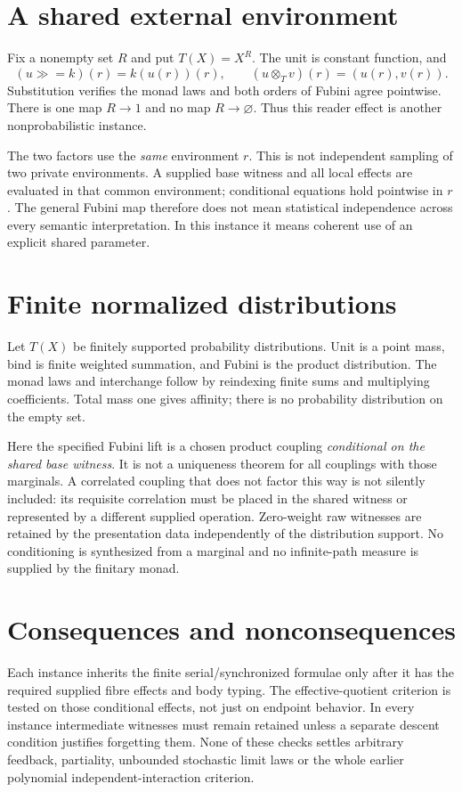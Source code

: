 \documentclass{article}
\begin{document}
\section{A shared external environment}
Fix a nonempty set $R$ and put $T(X)=X^R$. The unit is constant function, and
\[
 (u\mathbin{\gg=}k)(r)=k(u(r))(r),\qquad
 (u\otimes_Tv)(r)=(u(r),v(r)).
\]
Substitution verifies the monad laws and both orders of Fubini agree pointwise. There is one map $R\to1$ and no map $R\to\varnothing$. Thus this reader effect is another nonprobabilistic instance.

The two factors use the \emph{same} environment $r$. This is not independent sampling of two private environments. A supplied base witness and all local effects are evaluated in that common environment; conditional equations hold pointwise in $r$. The general Fubini map therefore does not mean statistical independence across every semantic interpretation. In this instance it means coherent use of an explicit shared parameter.

\section{Finite normalized distributions}
Let $T(X)$ be finitely supported probability distributions. Unit is a point mass, bind is finite weighted summation, and Fubini is the product distribution. The monad laws and interchange follow by reindexing finite sums and multiplying coefficients. Total mass one gives affinity; there is no probability distribution on the empty set.

Here the specified Fubini lift is a chosen product coupling \emph{conditional on the shared base witness}. It is not a uniqueness theorem for all couplings with those marginals. A correlated coupling that does not factor this way is not silently included: its requisite correlation must be placed in the shared witness or represented by a different supplied operation. Zero-weight raw witnesses are retained by the presentation data independently of the distribution support. No conditioning is synthesized from a marginal and no infinite-path measure is supplied by the finitary monad.

\section{Consequences and nonconsequences}
Each instance inherits the finite serial/synchronized formulae only after it has the required supplied fibre effects and body typing. The effective-quotient criterion is tested on those conditional effects, not just on endpoint behavior. In every instance intermediate witnesses must remain retained unless a separate descent condition justifies forgetting them. None of these checks settles arbitrary feedback, partiality, unbounded stochastic limit laws or the whole earlier polynomial independent-interaction criterion.
\end{document}
